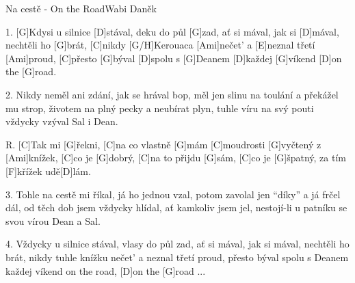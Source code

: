 \begin{song}{Na cestě - On the Road}{Wabi Daněk}


\begin{xverse}{1. }
[G]Kdysi u silnice [D]stával, deku do půl [G]zad,
ať si mával, jak si [D]mával, nechtěli ho [G]brát,
[C]nikdy [G/H]Kerouaca [Ami]nečet' a [E]neznal třetí [Ami]proud,
[C]přesto [G]býval [D]spolu s [G]Deanem [D]každej [G]víkend [D]on the [G]road.
\end{xverse}

\begin{xverse}{2. }
Nikdy neměl ani zdání, jak se hrával bop,
měl jen slinu na toulání a překážel mu strop,
životem na plný pecky a neubírat plyn,
tuhle víru na svý pouti vždycky vzýval Sal i Dean.
\end{xverse}

\begin{xverse}{R. }
[C]Tak mi [G]{}řekni, [C]na co vlastně [G]mám
[C]moudrosti [G]vyčtený z [Ami]knížek,
[C]co je [G]dobrý, [C]na to přijdu [G]sám,
[C]co je [G]{}špatný, za tím [F]křížek udě[D]lám.
\end{xverse}

\begin{xverse}{3. }
Tohle na cestě mi říkal, já ho jednou vzal,
potom zavolal jen ``díky'' a já frčel dál,
od těch dob jsem vždycky hlídal, ať kamkoliv jsem jel,
nestojí-li u patníku se svou vírou Dean a Sal.
\end{xverse}

\begin{xverse}{4. }
Vždycky u silnice stával, vlasy do půl zad,
ať si mával, jak si mával, nechtěli ho brát,
nikdy tuhle knížku nečet' a neznal třetí proud,
přesto býval spolu s Deanem každej víkend on the road,
[D]on the [G]road ...
\end{xverse}

\end{song}

